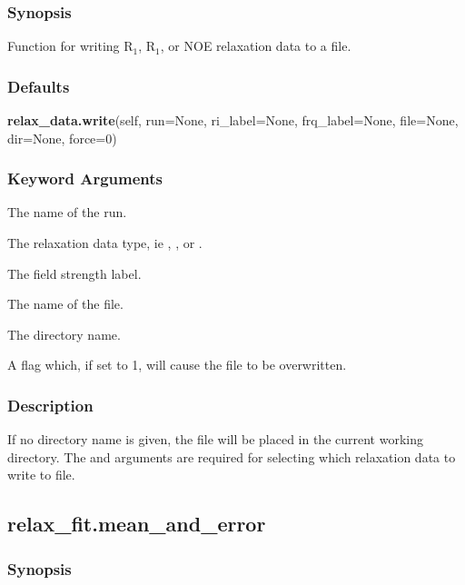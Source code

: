   
 \subsubsection{Synopsis} 

 Function for writing R$_1$, R$_1$, or NOE relaxation data to a file. 
  

  
 \subsubsection{Defaults} 

 \textsf{\textbf{relax\_data.write}(self, run=None, ri\_label=None, frq\_label=None, file=None, dir=None, force=0)} 

  
 \subsubsection{Keyword Arguments} 

   The name of the run.   

   The relaxation data type, ie , , or .   

   The field strength label.   

   The name of the file.   

   The directory name.   

   A flag which, if set to 1, will cause the file to be overwritten.  

  

  
 \subsubsection{Description} 

 If no directory name is given, the file will be placed in the current working directory. The  and  arguments are required for selecting which relaxation data to write to file. 
  

  

 \newpage 

 \subsection{relax\_fit.mean\_and\_error} 

  
 \subsubsection{Synopsis} 


